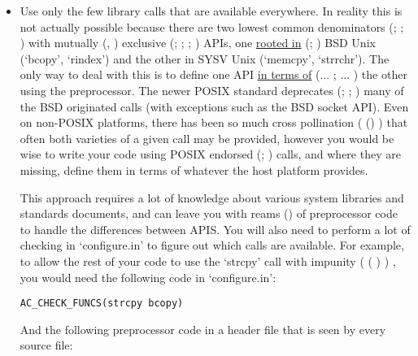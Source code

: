 \begin{itemize}
\item Use only the few library calls that are available everywhere. In 
reality this is not actually possible because there are two lowest common 
denominators ({\MaQ{}}; {\MaQ{}}; {\McQ{}}) with mutually ({\MdQ{}}, {\MfQ{}})
exclusive ({\MfQ{}}; {\McQ{}}; {\MaQ{}}; {\MdQ{}}) APIs,
one \underline{rooted in} ({\MbQ{}}; {\MgQ{}}) BSD Unix
(`bcopy', `rindex') and the other in SYSV Unix (`memcpy', `strrchr'). The 
only way to deal with this is to define one API 
\underline{in terms of} ({\MaQ{}}... {\McQ{}}; {\MaQ{}}... {\MbQ{}}) the other 
using the preprocessor. The newer POSIX standard 
deprecates ({\McQ{}}; {\MaQ{}}; {\MjQ{}}) many of the BSD 
originated calls (with exceptions such as the BSD socket API). Even on 
non-POSIX platforms, there has been so much cross pollination ({\MfQ{}} ({\MaQ{}}) )
that often both varieties of a given call may be provided, however you 
would be wise to write your code using POSIX endorsed ({\MjQ{}}; {\McQ{}}) calls,
and where they are missing, define them in terms of whatever the 
host platform provides. 

This approach requires a lot of knowledge about various system libraries and 
standards documents, and can leave you with reams ({\MaQ{}}) of preprocessor 
code to handle the differences between APIS. You will also need to perform a 
lot of checking in `configure.in' to figure out which calls are available.
For example, to allow the rest of your code to use the `strcpy' call with 
impunity ( ({\MfQ{}} {\MfQ{}} {\MdQ{}}) {\MaQ{}}) , you would need the 
following code in `configure.in': 

\begin{Verbatim}[frame=single]
AC_CHECK_FUNCS(strcpy bcopy)
\end{Verbatim}

And the following preprocessor code in a header file that is seen by 
every source file: 


\end{itemize}
